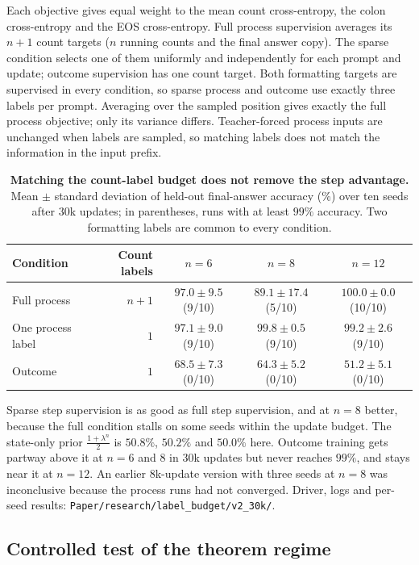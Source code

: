 Each objective gives equal weight to the mean count cross-entropy, the colon cross-entropy and the EOS cross-entropy.
Full process supervision averages its $n+1$ count targets ($n$ running counts and the final answer copy). The sparse
condition selects one of them uniformly and independently for each prompt and update; outcome supervision has one
count target. Both formatting targets are supervised in every condition, so sparse process and outcome use exactly
three labels per prompt. Averaging over the sampled position gives exactly the full process objective; only its
variance differs. Teacher-forced process inputs are unchanged when labels are sampled, so matching labels does not
match the information in the input prefix.

\begin{table}[H]
\centering\small
\begin{tabular}{@{}lrccc@{}}
\toprule
Condition & Count labels & $n=6$ & $n=8$ & $n=12$\\
\midrule
Full process & $n+1$ & $97.0\pm9.5$ (9/10) & $89.1\pm17.4$ (5/10) & $100.0\pm0.0$ (10/10)\\
One process label & $1$ & $97.1\pm9.0$ (9/10) & $99.8\pm0.5$ (9/10) & $99.2\pm2.6$ (9/10)\\
Outcome & $1$ & $68.5\pm7.3$ (0/10) & $64.3\pm5.2$ (0/10) & $51.2\pm5.1$ (0/10)\\
\bottomrule
\end{tabular}
\caption{\textbf{Matching the count-label budget does not remove the step advantage.} Mean $\pm$ standard deviation of
held-out final-answer accuracy (\%) over ten seeds after $30$k updates; in parentheses, runs with at least $99\%$ accuracy.
Two formatting labels are common to every condition.}
\label{tab:label-budget}
\end{table}
Sparse step supervision is as good as full step supervision, and at $n=8$ better, because the full condition stalls on
some seeds within the update budget. The state-only prior $\frac{1+\lambda^n}2$ is $50.8\%$, $50.2\%$ and $50.0\%$ here. Outcome training
gets partway above it at $n=6$ and $8$ in $30$k updates but never reaches $99\%$, and stays near it at $n=12$. An earlier $8$k-update version with
three seeds at $n=8$ was inconclusive because the process runs had not converged. Driver, logs and per-seed results:
\nolinkurl{Paper/research/label_budget/v2_30k/}.

\subsection{Controlled test of the theorem regime}
\label{app:exp-regime}
\label{app:regime}
